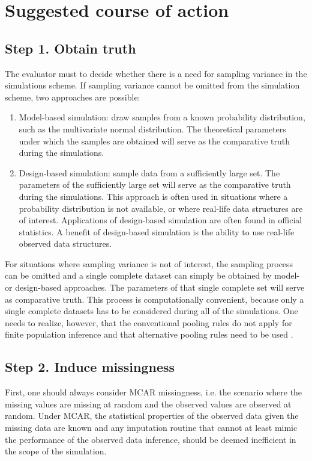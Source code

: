 \documentclass[12pt, a4paper]{article}
\begin{document}
\section*{Suggested course of action}
\subsection*{Step 1. Obtain truth}
The evaluator must to decide whether there is a need for sampling variance in the simulations scheme. If sampling variance cannot be omitted from the simulation scheme, two approaches are possible:
\begin{enumerate}
  \item Model-based simulation: draw samples from a known probability distribution, such as the multivariate normal distribution. The theoretical parameters under which the samples are obtained will serve as the comparative truth during the simulations. 
  \item Design-based simulation: sample data from a sufficiently large set. The parameters of the sufficiently large set will serve as the comparative truth during the simulations. This approach is often used in situations where a probability distribution is not available, or where real-life data structures are of interest. Applications of design-based simulation are often found in official statistics. A benefit of design-based simulation is the ability to use real-life observed data structures. 
\end{enumerate}
For situations where sampling variance is not of interest, the sampling process can be omitted and a single complete dataset can simply be obtained by model- or design-based approaches. The parameters of that single complete set will serve as comparative truth. This process is computationally convenient, because only a single complete datasets has to be considered during all of the simulations. One needs to realize, however, that the conventional pooling rules \citep[cf.][p. 76-77]{rubin1987} do not apply for finite population inference and that alternative pooling rules need to be used \citep{raghunathan2003multiple,vink2014pooling}. 

\subsection*{Step 2. Induce missingness}
First, one should always consider MCAR missingness, i.e. the scenario where the missing values are missing at random and the observed values are observed at random. Under MCAR, the statistical properties of the observed data given the missing data are known and any imputation routine that cannot at least mimic the performance of the observed data inference, should be deemed inefficient in the scope of the simulation.  
\end{document}
